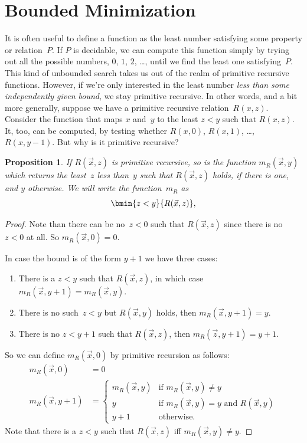 \documentclass[10pt,a4paper]{article}
\theoremstyle{plain}
\newtheorem{prop}[thm]{Proposition}
\theoremstyle{definition}
\theoremstyle{remark}
\newenvironment{explain}{}{}
\newcommand*{\olfileid}[3]{}
\newcommand*{\olsection}[1]{\section*{#1}}
\begin{document}



\olfileid{cmp}{rec}{bmi}
\olsection{Bounded Minimization}

\begin{explain}
It is often useful to define a function as the least number satisfying
some property or relation~$P$. If $P$ is decidable, we can compute
this function simply by trying out all the possible numbers, $0$, $1$,
$2$, \dots, until we find the least one satisfying~$P$.  This kind of
unbounded search takes us out of the realm of primitive recursive
functions. However, if we're only interested in the least number
\emph{less than some independently given bound}, we stay primitive
recursive. In other words, and a bit more generally, suppose we have a
primitive recursive relation~$R(x,z)$. Consider the function that maps
$x$ and~$y$ to the least $z < y$ such that $R(x, z)$. It, too, can be
computed, by testing whether $R(x, 0)$, $R(x, 1)$, \dots, $R(x, y-1)$.
But why is it primitive recursive?
\end{explain}

\begin{prop}
If $R(\vec x, z)$ is primitive recursive, so is the function
$m_R(\vec{x}, y)$ which returns the least~$z$ less than~$y$ such that
$R(\vec x, z)$ holds, if there is one, and $y$ otherwise.  We will
write the function~$m_R$ as
\[
\bmin{z < y}{R(\vec{x}, z)},
\]
\end{prop}

\begin{proof}
Note than there can be no~$z < 0$ such that $R(\vec{x}, z)$ since
there is no $z < 0$ at all.  So $m_R(\vec x, 0) = 0$.

In case the bound is of the form $y + 1$ we have three cases:
\begin{enumerate}
\item There is a $z < y$ such that $R(\vec{x}, z)$, in which case
$m_R(\vec{x}, y+1) = m_R(\vec{x}, y)$.
\item There is no such~$z<y$ but $R(\vec{x}, y)$ holds, then
$m_R(\vec{x}, y+1) = y$.
\item There is no $z < y+1$ such that $R(\vec{x}, z)$, then
$m_R(\vec{z}, y+1) = y+1$.
\end{enumerate}
So we can define $m_R(\vec x, 0)$ by primitive recursion as follows:
\begin{align*}
m_R(\vec{x}, 0) & = 0\\
m_R(\vec{x}, y+1) & =
\begin{cases}
m_R(\vec{x}, y) & \text{if $m_R(\vec x, y) \neq y$}\\
y & \text{if $m_R(\vec x, y) = y$ and $R(\vec{x}, y)$}\\
y+1 & \text{otherwise.}
\end{cases}
\end{align*}
Note that there is a $z<y$ such that $R(\vec x, z)$ iff $m_R(\vec x,
y) \neq y$.
\end{proof}
\end{document}
